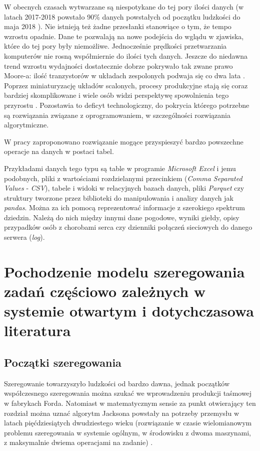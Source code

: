\documentclass[brudnopis]{xmgr}
\begin{document}
W obecnych czasach wytwarzane są niespotykane do tej pory ilości danych (w latach 2017-2018 powstało 90\% danych powstałych od początku ludzkości do maja 2018 \cite{Forbes:2018:FBS}).
Nie istnieją też żadne przesłanki stanowiące o tym, że tempo wzrostu opadnie.
Dane te pozwalają na nowe podejścia do wglądu w zjawiska, które do tej pory były niemożliwe.
Jednocześnie prędkości przetwarzania komputerów nie rosną współmiernie do ilości tych danych. Jeszcze do niedawna trend wzrostu wydajności dostatecznie dobrze pokrywało tak zwane prawo Moore-a: ilość tranzystorów w układach zespolonych podwaja się co dwa lata \cite{MOORE:1965:X}. Poprzez miniaturyzację układów scalonych, procesy produkcyjne stają się coraz bardziej skomplikowane i wiele osób widzi perspektywę spowolnienia tego przyrostu \cite{NOTMOORE:2020:X}. Pozostawia to deficyt technologiczny, do pokrycia którego potrzebne są rozwiązania związane z oprogramowaniem, w szczególności rozwiązania algorytmiczne.
\medskip

W pracy zaproponowano rozwiązanie mogące przyspieszyć bardzo powszechne operacje na danych w postaci tabel.
\medskip

Przykładami danych tego typu są table w programie \emph{Microsoft Excel} i jemu podobnych, pliki z wartościami rozdzielanymi przecinkiem (\emph{Comma Separated Values} - \emph{CSV}), tabele i widoki w relacyjnych bazach danych, pliki \emph{Parquet} \cite{parquet} czy struktury tworzone przez biblioteki do manipulowania i analizy danych jak \emph{pandas}.
Można za ich pomocą reprezentować informacje z szerokiego spektrum dziedzin. Należą do nich między innymi dane pogodowe, wyniki giełdy, opisy przypadków osób z chorobami serca czy dzienniki połączeń sieciowych do danego serwera (\emph{log}).

\chapter{Pochodzenie modelu szeregowania zadań częściowo zależnych w systemie otwartym i dotychczasowa literatura}

\section{Początki szeregowania}
Szeregowanie towarzyszyło ludzkości od bardzo dawna, jednak początków współczesnego szeregowania można szukać we wprowadzeniu produkcji taśmowej w fabrykach Forda. Natomiast w matematycznym sensie za punkt otwierający ten rozdział można uznać algorytm Jacksona powstały na potrzeby przemysłu w latach pięćdziesiątych dwudziestego wieku (rozwiązanie w czasie wielomianowym problemu szeregowania w systemie ogólnym, w środowisku z dwoma maszynami, z maksymalnie dwiema operacjami na zadanie) \cite{jackson1956extension}.
\medskip
\end{document}
